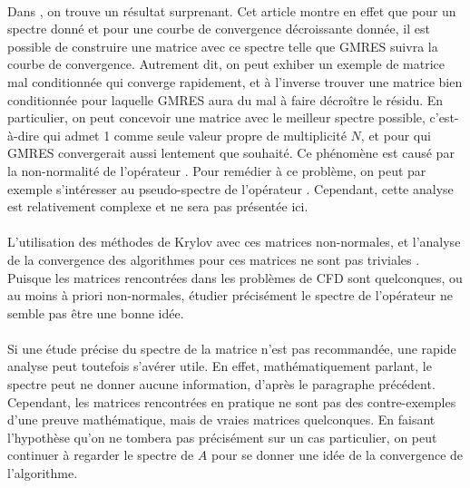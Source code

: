 		\paragraph{}
		Dans \cite{GreenbaumPtakStrakos1996}, on trouve un résultat surprenant.
		Cet article montre en effet que pour un spectre donné et pour une courbe de convergence décroissante donnée, il est possible de construire une matrice avec ce spectre telle que GMRES suivra la courbe de convergence.
		Autrement dit, on peut exhiber un exemple de matrice mal conditionnée qui converge rapidement, et à l'inverse trouver une matrice bien conditionnée pour laquelle GMRES aura du mal à faire décroître le résidu.
		En particulier, on peut concevoir une matrice avec le meilleur spectre possible, c'est-à-dire qui admet 1 comme seule valeur propre de multiplicité $N$, et pour qui GMRES convergerait aussi lentement que souhaité.
		Ce phénomène est causé par la non-normalité de l'opérateur \cite{GreenbaumStrakos1994, GreenbaumPtakStrakos1996}.
		Pour remédier à ce problème, on peut par exemple s'intéresser au pseudo-spectre de l'opérateur \cite{Trefethen1999}.
		Cependant, cette analyse est relativement complexe et ne sera pas présentée ici.

		\paragraph{}
		L'utilisation des méthodes de Krylov avec ces matrices non-normales, et l'analyse de la convergence des algorithmes pour ces matrices ne sont pas triviales \cite{LiesenTichy2004, Huhtanen2005}.
		Puisque les matrices rencontrées dans les problèmes de CFD sont quelconques, ou au moins à priori non-normales, étudier précisément le spectre de l'opérateur ne semble pas être une bonne idée.

		\paragraph{}
		Si une étude précise du spectre de la matrice n'est pas recommandée, une rapide analyse peut toutefois s'avérer utile.
		En effet, mathématiquement parlant, le spectre peut ne donner aucune information, d'après le paragraphe précédent.
		Cependant, les matrices rencontrées en pratique ne sont pas des contre-exemples d'une preuve mathématique, mais de vraies matrices quelconques.
		En faisant l'hypothèse qu'on ne tombera pas précisément sur un cas particulier, on peut continuer à regarder le spectre de $A$ pour se donner une idée de la convergence de l'algorithme.


